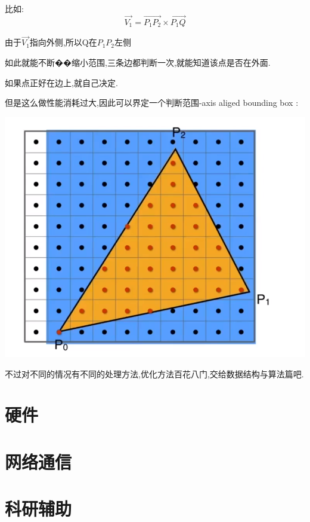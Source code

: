 \documentclass[UTF8,12pt]{ctexbook}
\begin{document}
{{{{{        比如:
        $$
          \vec{V_1} = \vec{P_1P_2} \times \vec{P_1Q}
        $$

        由于$\vec{V_1}$指向外侧,所以Q在$P_1P_2$左侧

        如此就能不断��缩小范围,三条边都判断一次,就能知道该点是否在外面.

        如果点正好在边上,就自己决定.

        但是这么做性能消耗过大,因此可以界定一个判断范围-axis aliged bounding box :

        \begin{center}
          \includegraphics[scale = 0.5]{resources/pixel_boundingBox.png}
        \end{center}

        不过对不同的情况有不同的处理方法,优化方法百花八门,交给数据结构与算法篇吧.
      }%

    }%

   }%

  \section{硬件}{

   }%

  \section{网络通信}{

   }%

  \section{科研辅助}{

}}}
\end{document}
